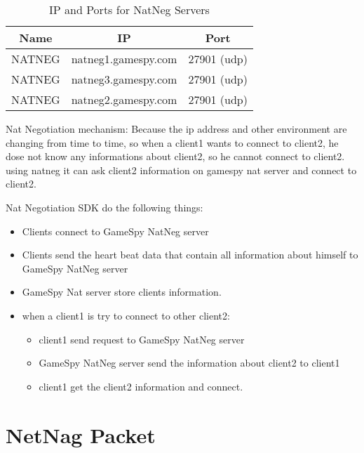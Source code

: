 \documentclass[oneside,titlepage,a4paper]{Definition/retrospy} %
\begin{document}
\begin{table}[H]
	\centering
	\begin{tabular}{|c|c|c|}
		\hline 
		\textbf{Name}&\textbf{IP}&\textbf{Port}\\ 
		\hline 
		NATNEG&natneg1.gamespy.com&27901 (udp) \\ 
		\hline
				NATNEG&natneg3.gamespy.com&27901 (udp) \\ 
		\hline 
				NATNEG&natneg2.gamespy.com&27901 (udp) \\ 
		\hline 
	\end{tabular} 
	\caption{IP and Ports for NatNeg Servers}
	\label{IP and Ports for NatNeg Servers}
	
\end{table}


Nat Negotiation mechanism:
Because the ip address and other environment are changing from time to time, so when a client1 wants to connect
to client2, he dose not know any informations about client2, so he cannot connect to client2. using natneg it can ask client2 information on gamespy nat server and connect to client2.

Nat Negotiation SDK do the following things:
\begin{itemize}
	\item Clients connect to GameSpy NatNeg server
	\item Clients send the heart beat data that contain all information about himself to GameSpy NatNeg server
	\item GameSpy Nat server store clients information.
	\item when a client1 is try to connect to other client2:
	\begin{itemize}
		\item client1 send request to GameSpy NatNeg server
	\item GameSpy NatNeg server send the information about client2 to client1
		\item  client1 get the client2 information and connect.
	\end{itemize}
	

\end{itemize}




\section{NetNag Packet}
\end{document}
